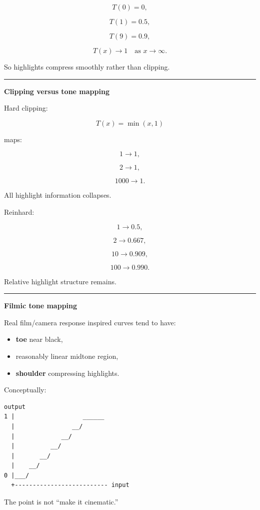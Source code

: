 \[
T(0)=0,
\]

\[
T(1)=0.5,
\]

\[
T(9)=0.9,
\]

\[
T(x)\rightarrow1
\quad \text{as }x\rightarrow\infty.
\]

So highlights compress smoothly rather than clipping.

\begin{center}\rule{0.5\linewidth}{0.5pt}\end{center}

\textbf{Clipping versus tone mapping}

Hard clipping:

\[
T(x)=\min(x,1)
\]

maps:

\[
1\rightarrow1,
\]

\[
2\rightarrow1,
\]

\[
1000\rightarrow1.
\]

All highlight information collapses.

Reinhard:

\[
1\rightarrow0.5,
\]

\[
2\rightarrow0.667,
\]

\[
10\rightarrow0.909,
\]

\[
100\rightarrow0.990.
\]

Relative highlight structure remains.

\begin{center}\rule{0.5\linewidth}{0.5pt}\end{center}

\textbf{Filmic tone mapping}

Real film/camera response inspired curves tend to have:

\begin{itemize}
\tightlist
\item
  \textbf{toe} near black,
\item
  reasonably linear midtone region,
\item
  \textbf{shoulder} compressing highlights.
\end{itemize}

Conceptually:

\begin{verbatim}
output
1 |                   ______
  |                __/
  |             __/
  |          __/
  |       __/
  |    __/
0 |___/
  +-------------------------- input
\end{verbatim}

The point is not ``make it cinematic.''


